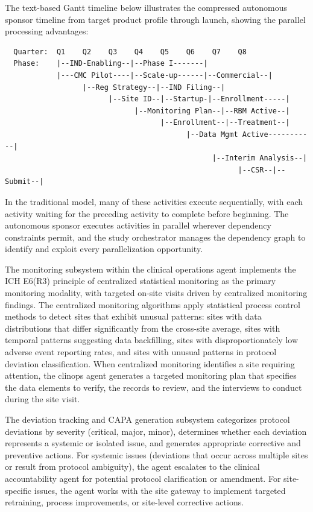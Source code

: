 The text-based Gantt timeline below illustrates the compressed autonomous sponsor timeline
from target product profile through launch, showing the parallel processing advantages:

\begin{verbatim}
  Quarter:  Q1    Q2    Q3    Q4    Q5    Q6    Q7    Q8
  Phase:    |--IND-Enabling--|--Phase I-------|
            |---CMC Pilot----|--Scale-up------|--Commercial--|
                  |--Reg Strategy--|--IND Filing--|
                        |--Site ID--|--Startup-|--Enrollment-----|
                              |--Monitoring Plan--|--RBM Active--|
                                    |--Enrollment--|--Treatment--|
                                          |--Data Mgmt Active-----------|
                                                |--Interim Analysis--|
                                                      |--CSR--|--Submit--|
\end{verbatim}

In the traditional model, many of these activities execute sequentially, with each activity
waiting for the preceding activity to complete before beginning. The autonomous sponsor
executes activities in parallel wherever dependency constraints permit, and the study
orchestrator manages the dependency graph to identify and exploit every parallelization
opportunity.

The monitoring subsystem within the clinical operations agent implements the ICH E6(R3)
principle of centralized statistical monitoring as the primary monitoring modality, with
targeted on-site visits driven by centralized monitoring findings. The centralized monitoring
algorithms apply statistical process control methods to detect sites that exhibit unusual
patterns: sites with data distributions that differ significantly from the cross-site
average, sites with temporal patterns suggesting data backfilling, sites with
disproportionately low adverse event reporting rates, and sites with unusual patterns in
protocol deviation classification. When centralized monitoring identifies a site requiring
attention, the clinops agent generates a targeted monitoring plan that specifies the data
elements to verify, the records to review, and the interviews to conduct during the site
visit.

The deviation tracking and CAPA generation subsystem categorizes protocol deviations by
severity (critical, major, minor), determines whether each deviation represents a systemic
or isolated issue, and generates appropriate corrective and preventive actions. For systemic
issues (deviations that occur across multiple sites or result from protocol ambiguity), the
agent escalates to the clinical accountability agent for potential protocol clarification or
amendment. For site-specific issues, the agent works with the site gateway to implement
targeted retraining, process improvements, or site-level corrective actions.

